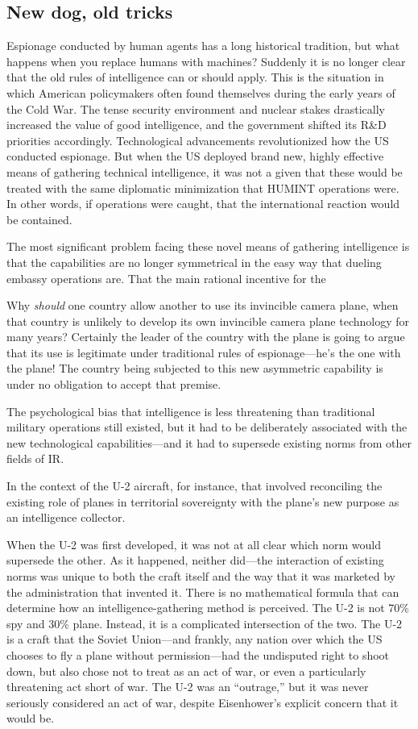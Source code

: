\documentclass{report}
\begin{document}
\subsection{New dog, old tricks}

Espionage conducted by human agents has a long historical tradition, but what happens when you replace humans with machines? Suddenly it is no longer clear that the old rules of intelligence can or should apply. This is the situation in which American policymakers often found themselves during the early years of the Cold War. The tense security environment and nuclear stakes drastically increased the value of good intelligence, and the government shifted its R\&D priorities accordingly. Technological advancements revolutionized how the US conducted espionage. But when the US deployed brand new, highly effective means of gathering technical intelligence, it was not a given that these would be treated with the same diplomatic minimization that HUMINT operations were. In other words, if operations were caught, that the international reaction would be contained.

The most significant problem facing these novel means of gathering intelligence is that the capabilities are no longer symmetrical in the easy way that dueling embassy operations are. That the main rational incentive for the

Why \emph{should} one country allow another to use its invincible camera plane, when that country is unlikely to develop its own invincible camera plane technology for many years? Certainly the leader of the country with the plane is going to argue that its use is legitimate under traditional rules of espionage---he's the one with the plane! The country being subjected to this new asymmetric capability is under no obligation to accept that premise.


The psychological bias that intelligence is less threatening than traditional military operations still existed, but it had to be deliberately associated with the new technological capabilities---and it had to supersede existing norms from other fields of IR.


In the context of the U-2 aircraft, for instance, that involved reconciling the existing role of planes in territorial sovereignty with the plane's new purpose as an intelligence collector.

When the U-2 was first developed, it was not at all clear which norm would supersede the other. As it happened, neither did---the interaction of existing norms was unique to both the craft itself and the way that it was marketed by the administration that invented it. There is no mathematical formula that can determine how an intelligence-gathering method is perceived. The U-2 is not 70\% spy and 30\% plane. Instead, it is a complicated intersection of the two. The U-2 is a craft that the Soviet Union---and frankly, any nation over which the US chooses to fly a plane without permission---had the undisputed right to shoot down, but also chose not to treat as an act of war, or even a particularly threatening act short of war. The U-2 was an ``outrage,'' but it was never seriously considered an act of war, despite Eisenhower's explicit concern that it would be.
\end{document}
